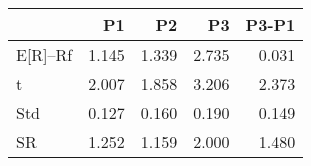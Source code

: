 \begin{tabular}{lrrrr}
\toprule
 & P1 & P2 & P3 & P3-P1 \\
\midrule
E[R]--Rf & 1.145 & 1.339 & 2.735 & 0.031 \\
t & 2.007 & 1.858 & 3.206 & 2.373 \\
Std & 0.127 & 0.160 & 0.190 & 0.149 \\
SR & 1.252 & 1.159 & 2.000 & 1.480 \\
\bottomrule
\end{tabular}
